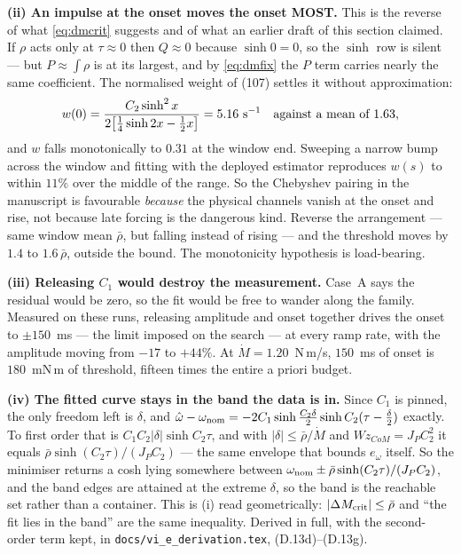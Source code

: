 \documentclass[11pt]{article}
\newcommand{\Wz}{W\!z_{CoM}}
\begin{document}
\textbf{(ii) An impulse at the onset moves the onset MOST.} This is the
reverse of what \eqref{eq:dmcrit} suggests and of what an earlier draft
of this section claimed. If $\rho$ acts only at $\tau\approx0$ then
$Q\approx0$ because $\sinh 0 = 0$, so the $\sinh$ row is silent --- but
$P \approx \int\rho$ is at its largest, and by \eqref{eq:dmfix} the $P$
term carries nearly the same coefficient. The normalised weight of
(107) settles it without approximation:
\[
  w(0) = \frac{C_2\sinh^2 x}{2\bigl[\tfrac14\sinh 2x - \tfrac12x\bigr]}
       = 5.16~{\rm s}^{-1}
  \quad\text{against a mean of } 1.63,
\]
and $w$ falls monotonically to $0.31$ at the window end. Sweeping a
narrow bump across the window and fitting with the deployed estimator
reproduces $w(s)$ to within $11\%$ over the middle of the range. So the
Chebyshev pairing in the manuscript is favourable \emph{because} the
physical channels vanish at the onset and rise, not because late forcing
is the dangerous kind. Reverse the arrangement --- same window mean
$\bar\rho$, but falling instead of rising --- and the threshold moves by
$1.4$ to $1.6\,\bar\rho$, outside the bound. The monotonicity hypothesis
is load-bearing.

\textbf{(iii) Releasing $C_1$ would destroy the measurement.} Case~A
says the residual would be zero, so the fit would be free to wander
along the family. Measured on these runs, releasing amplitude and onset
together drives the onset to $\pm150$~ms --- the limit imposed on the
search --- at every ramp rate, with the amplitude moving from $-17$ to
$+44\%$. At $\dot M = 1.20$~N\,m/s, $150$~ms of onset is $180$~mN\,m of
threshold, fifteen times the entire a priori budget.

\textbf{(iv) The fitted curve stays in the band the data is in.} Since
$C_1$ is pinned, the only freedom left is $\delta$, and
$\hat\omega - \omega_{\rm nom}
 = -2C_1\sinh\frac{C_2\delta}{2}\sinh C_2(\tau - \frac\delta2)$
exactly. To first order that is $C_1C_2|\delta|\sinh C_2\tau$, and with
$|\delta| \le \bar\rho/\dot M$ and $\Wz = J_PC_2^{2}$ it equals
$\bar\rho\sinh(C_2\tau)/(J_PC_2)$ --- the same envelope that bounds
$e_\omega$ itself. So the minimiser returns a cosh lying somewhere
between $\omega_{\rm nom} \pm \bar\rho\sinh(C_2\tau)/(J_PC_2)$, and the
band edges are attained at the extreme $\delta$, so the band is the
reachable set rather than a container. This is (i) read geometrically:
$|\Delta M_{\rm crit}| \le \bar\rho$ and ``the fit lies in the band''
are the same inequality. Derived in full, with the second-order term
kept, in \texttt{docs/vi\_e\_derivation.tex}, (D.13d)--(D.13g).
\end{document}
